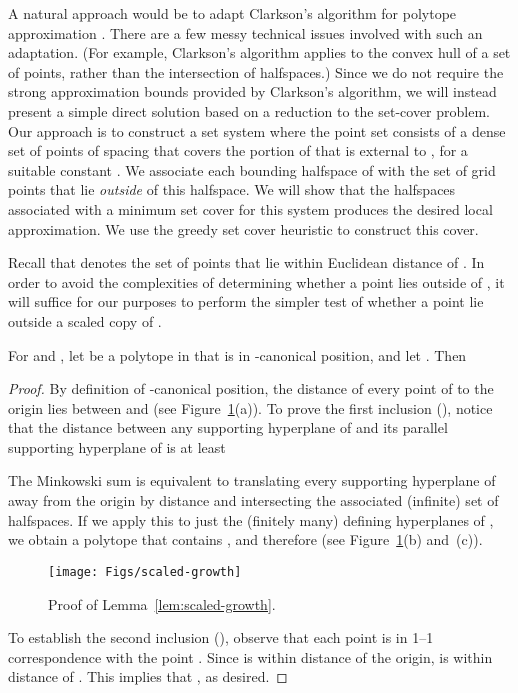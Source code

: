 \documentclass[11pt]{article}   \usepackage[letterpaper,hmargin=2.1cm,vmargin=3cm]{geometry}
\begin{document}
A natural approach would be to adapt Clarkson's algorithm for polytope approximation \cite{Clarkson-polytope}. There are a few messy technical issues involved with such an adaptation. (For example, Clarkson's algorithm applies to the convex hull of a set of points, rather than the intersection of halfspaces.) Since we do not require the strong approximation bounds provided by Clarkson's algorithm, we will instead present a simple direct solution based on a reduction to the set-cover problem. Our approach is to construct a set system where the point set consists of a dense set of points of spacing  that covers the portion of  that is external to , for a suitable constant . We associate each bounding halfspace of  with the set of grid points that lie \emph{outside} of this halfspace. We will show that the halfspaces associated with a minimum set cover for this system produces the desired local approximation. We use the greedy set cover heuristic to construct this cover.

Recall that  denotes the set of points that lie within Euclidean distance  of . In order to avoid the complexities of determining whether a point lies outside of , it will suffice for our purposes to perform the simpler test of whether a point lie outside a scaled copy of .

\begin{lemma} \label{lem:scaled-growth}
For  and , let  be a polytope in  that is in -canonical position, and let . Then 

\end{lemma}


\begin{proof}
By definition of -canonical position, the distance of every point of  to the origin lies between  and  (see Figure~\ref{fig:scaled-growth}(a)). To prove the first inclusion (), notice that the distance between any supporting hyperplane of  and its parallel supporting hyperplane of  is at least

The Minkowski sum  is equivalent to translating every supporting hyperplane of  away from the origin by distance  and intersecting the associated (infinite) set of halfspaces. If we apply this to just the (finitely many) defining hyperplanes of , we obtain a polytope that contains , and therefore  (see Figure~\ref{fig:scaled-growth}(b) and~(c)). 

\begin{figure}[htbp]
  \centerline{\texttt{[image: Figs/scaled-growth]}}
  \caption{Proof of Lemma~\ref{lem:scaled-growth}.}
  \label{fig:scaled-growth}
\end{figure}


To establish the second inclusion (), observe that each point  is in 1--1 correspondence with the point . Since  is within distance  of the origin,  is within distance  of . This implies that , as desired.
\end{proof}
\end{document}

